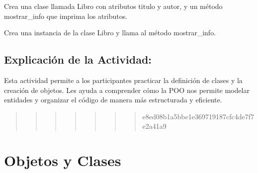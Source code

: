 \documentclass[
  a4paper,
  onepage,
  openany]{scrreprt}
\begin{document}
\begin{tcolorbox}[enhanced jigsaw, breakable, opacityback=0, toptitle=1mm, coltitle=black, toprule=.15mm, rightrule=.15mm, colframe=quarto-callout-important-color-frame, opacitybacktitle=0.6, arc=.35mm, title=\textcolor{quarto-callout-important-color}{\faExclamation}\hspace{0.5em}{Actividad Práctica:}, titlerule=0mm, colbacktitle=quarto-callout-important-color!10!white, bottomtitle=1mm, bottomrule=.15mm, colback=white, left=2mm, leftrule=.75mm]

Crea una clase llamada Libro con atributos titulo y autor, y un método
mostrar\_info que imprima los atributos.

Crea una instancia de la clase Libro y llama al método mostrar\_info.

\end{tcolorbox}

\hypertarget{explicaciuxf3n-de-la-actividad-47}{%
\section{Explicación de la
Actividad:}\label{explicaciuxf3n-de-la-actividad-47}}

Esta actividad permite a los participantes practicar la definición de
clases y la creación de objetos. Les ayuda a comprender cómo la POO nos
permite modelar entidades y organizar el código de manera más
estructurada y eficiente.

\begin{quote}
\begin{quote}
\begin{quote}
\begin{quote}
\begin{quote}
\begin{quote}
\begin{quote}
e8ed08b1a5bbe1e369719187cfc4de7f7e2a41a9
\end{quote}
\end{quote}
\end{quote}
\end{quote}
\end{quote}
\end{quote}
\end{quote}

\hypertarget{objetos-y-clases}{%
\chapter{Objetos y Clases}\label{objetos-y-clases}}
\end{document}
